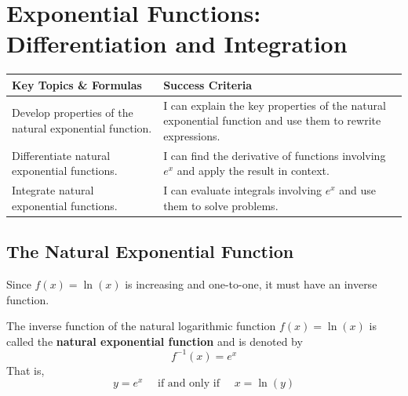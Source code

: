 \documentclass[12pt, letterpaper]{article}
\begin{document}
\section{Exponential Functions: Differentiation and Integration}
\begin{objectives}
    \renewcommand{\arraystretch}{1.5} %
    \begin{tabularx}{\textwidth}{@{} >{\raggedright\arraybackslash}X >{\raggedright\arraybackslash}X @{}}
        
        \textbf{Key Topics \& Formulas} & \textbf{Success Criteria} \\ 
        \midrule[1.5pt] %
        
        Develop properties of the natural exponential function.
        & I can explain the key properties of the natural exponential function and use them to rewrite expressions. \\
        \midrule %
        
        Differentiate natural exponential functions.
        & I can find the derivative of functions involving $e^x$ and apply the result in context. \\
        \midrule

        Integrate natural exponential functions.
        & I can evaluate integrals involving $e^x$ and use them to solve problems.
    \end{tabularx}
\end{objectives}

\subsection{The Natural Exponential Function}

Since $f(x) = \ln(x)$ is increasing and one-to-one, it must have an inverse function.

\begin{definition}[title=Definition of the Natural Exponential Function]
    The inverse function of the natural logarithmic function $f(x)=\ln(x)$ is called the \textbf{natural exponential function} and is denoted by
    $$f^{-1}(x) = e^x$$
    That is,
    $$y=e^x \quad \text{ if and only if } \quad x = \ln(y)$$
\end{definition}
\end{document}
